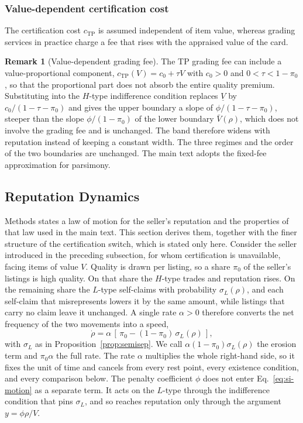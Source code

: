 \documentclass[11pt,letterpaper]{article}
\theoremstyle{definition}
\newtheorem{remark}{Remark}[section]
\begin{document}
\subsubsection*{Value-dependent certification cost}

The certification cost $c_{\text{TP}}$ is assumed independent of item value, whereas grading services in practice charge a fee that rises with the appraised value of the card.

\begin{remark}[Value-dependent grading fee]\label{rem:valuefee}
The TP grading fee can include a value-proportional component, $c_{\text{TP}}(V) = c_0 + \tau V$ with $c_0 > 0$ and $0 < \tau < 1 - \pi_0$, so that the proportional part does not absorb the entire quality premium. Substituting into the $H$-type indifference condition replaces $\underline{V}$ by $c_0/(1 - \tau - \pi_0)$ and gives the upper boundary a slope of $\phi/(1 - \tau - \pi_0)$, steeper than the slope $\phi/(1 - \pi_0)$ of the lower boundary $\bar{V}(\rho)$, which does not involve the grading fee and is unchanged. The band therefore widens with reputation instead of keeping a constant width. The three regimes and the order of the two boundaries are unchanged. The main text adopts the fixed-fee approximation for parsimony.
\end{remark}

\subsection{Reputation Dynamics}\label{subsec:th-D}

Methods states a law of motion for the seller's reputation and the
properties of that law used in the main text. This section derives them,
together with the finer structure of the certification switch, which is stated
only here. Consider the seller introduced in the preceding subsection, for whom
certification is unavailable, facing items of value $V$. Quality is drawn per
listing, so a share $\pi_0$ of the seller's listings is high quality. On that
share the $H$-type trades and reputation rises. On the remaining share
the $L$-type self-claims with probability $\sigma_L(\rho)$, and each self-claim that misrepresents lowers it by the same amount, while listings that carry no claim leave it unchanged. A single rate
$\alpha > 0$ therefore converts the net frequency of the two movements into a
speed,
\begin{equation}
\dot{\rho} = \alpha\,[\,\pi_0 - (1 - \pi_0)\,\sigma_L(\rho)\,] ,
\label{eq:si-motion}
\end{equation}
with $\sigma_L$ as in Proposition~\ref{prop:semisep}. We call
$\alpha(1 - \pi_0)\sigma_L(\rho)$ the erosion term and $\pi_0\alpha$ the full
rate. The rate $\alpha$ multiplies the whole right-hand side, so it fixes the
unit of time and cancels from every rest point, every existence condition, and
every comparison below. The penalty coefficient $\phi$ does not enter
Eq.~\ref{eq:si-motion} as a separate term. It acts on the $L$-type through the
indifference condition that pins $\sigma_L$, and so reaches reputation only through the argument $y = \phi\rho/V$.
\end{document}
